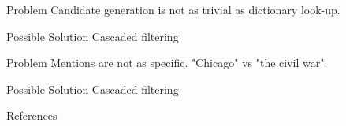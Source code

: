 \begin{frame}

\begin{block}{Problem}
Candidate generation is not as trivial as dictionary look-up.
\end{block}

\begin{exampleblock}{Possible Solution}
Cascaded filtering
\end{exampleblock}

\begin{block}{Problem}
Mentions are not as specific. "Chicago" vs "the civil war".
\end{block}

\begin{exampleblock}{Possible Solution}
Cascaded filtering
\end{exampleblock}
\end{frame}






\begin{frame}[allowframebreaks]{References}
\def\newblock{}


\end{frame}


